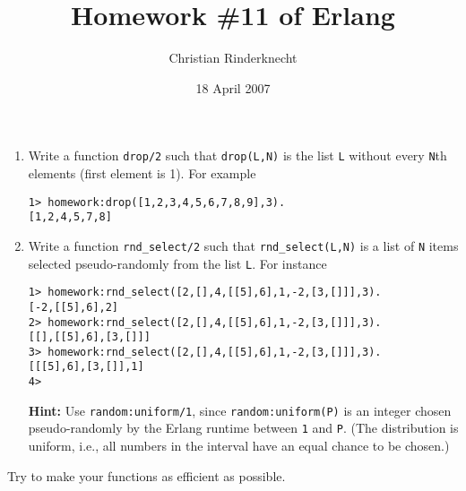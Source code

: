 \documentclass[11pt,a4paper]{article}
\title{Homework \#11 of Erlang}
\author{Christian Rinderknecht}
\date{18 April 2007}
\newcommand\Erlang{\textsf{Erlang}\xspace}
\begin{document}
\maketitle

\thispagestyle{empty}

\begin{enumerate}

  \item Write a function \texttt{drop/2} such that \texttt{drop(L,N)}
    is the list \texttt{L} without every \texttt{N}th elements (first
    element is 1). For example
{\small
\begin{verbatim}
1> homework:drop([1,2,3,4,5,6,7,8,9],3).
[1,2,4,5,7,8]
\end{verbatim}
}

  \item Write a function \texttt{rnd\_select/2} such that
    \texttt{rnd\_select(L,N)} is a list of \texttt{N} items selected
    pseudo-randomly from the list \texttt{L}. For instance
{\small
\begin{verbatim}
1> homework:rnd_select([2,[],4,[[5],6],1,-2,[3,[]]],3).
[-2,[[5],6],2]
2> homework:rnd_select([2,[],4,[[5],6],1,-2,[3,[]]],3).
[[],[[5],6],[3,[]]]
3> homework:rnd_select([2,[],4,[[5],6],1,-2,[3,[]]],3).
[[[5],6],[3,[]],1]
4>
\end{verbatim}
}
\textbf{Hint:} Use \texttt{random:uniform/1}, since
\texttt{random:uniform(P)} is an integer chosen pseudo-randomly by the
\Erlang runtime between \texttt{1} and \texttt{P}. (The distribution
is uniform, i.e., all numbers in the interval have an equal chance to
be chosen.)
\end{enumerate}

Try to make your functions as efficient as possible.
\end{document}
